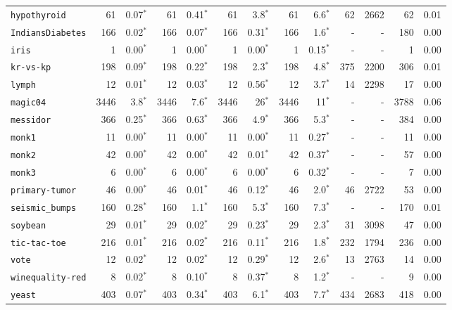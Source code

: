 \begin{tabular}{lrrrrrrrrrrrr}
\texttt{hypothyroid} & 61 & 0.07$^*$ & 61 & 0.41$^*$ & 61 & 3.8$^*$ & 61 & 6.6$^*$ & 62 & 2662 & 62 & 0.01\\
\texttt{IndiansDiabetes} & 166 & 0.02$^*$ & 166 & 0.07$^*$ & 166 & 0.31$^*$ & 166 & 1.6$^*$ & - & - & 180 & 0.00\\
\texttt{iris} & 1 & 0.00$^*$ & 1 & 0.00$^*$ & 1 & 0.00$^*$ & 1 & 0.15$^*$ & - & - & 1 & 0.00\\
\texttt{kr-vs-kp} & 198 & 0.09$^*$ & 198 & 0.22$^*$ & 198 & 2.3$^*$ & 198 & 4.8$^*$ & 375 & 2200 & 306 & 0.01\\
\texttt{lymph} & 12 & 0.01$^*$ & 12 & 0.03$^*$ & 12 & 0.56$^*$ & 12 & 3.7$^*$ & 14 & 2298 & 17 & 0.00\\
\texttt{magic04} & 3446 & 3.8$^*$ & 3446 & 7.6$^*$ & 3446 & 26$^*$ & 3446 & 11$^*$ & - & - & 3788 & 0.06\\
\texttt{messidor} & 366 & 0.25$^*$ & 366 & 0.63$^*$ & 366 & 4.9$^*$ & 366 & 5.3$^*$ & - & - & 384 & 0.00\\
\texttt{monk1} & 11 & 0.00$^*$ & 11 & 0.00$^*$ & 11 & 0.00$^*$ & 11 & 0.27$^*$ & - & - & 11 & 0.00\\
\texttt{monk2} & 42 & 0.00$^*$ & 42 & 0.00$^*$ & 42 & 0.01$^*$ & 42 & 0.37$^*$ & - & - & 57 & 0.00\\
\texttt{monk3} & 6 & 0.00$^*$ & 6 & 0.00$^*$ & 6 & 0.00$^*$ & 6 & 0.32$^*$ & - & - & 7 & 0.00\\
\texttt{primary-tumor} & 46 & 0.00$^*$ & 46 & 0.01$^*$ & 46 & 0.12$^*$ & 46 & 2.0$^*$ & 46 & 2722 & 53 & 0.00\\
\texttt{seismic\_bumps} & 160 & 0.28$^*$ & 160 & 1.1$^*$ & 160 & 5.3$^*$ & 160 & 7.3$^*$ & - & - & 170 & 0.01\\
\texttt{soybean} & 29 & 0.01$^*$ & 29 & 0.02$^*$ & 29 & 0.23$^*$ & 29 & 2.3$^*$ & 31 & 3098 & 47 & 0.00\\
\texttt{tic-tac-toe} & 216 & 0.01$^*$ & 216 & 0.02$^*$ & 216 & 0.11$^*$ & 216 & 1.8$^*$ & 232 & 1794 & 236 & 0.00\\
\texttt{vote} & 12 & 0.02$^*$ & 12 & 0.02$^*$ & 12 & 0.29$^*$ & 12 & 2.6$^*$ & 13 & 2763 & 14 & 0.00\\
\texttt{winequality-red} & 8 & 0.02$^*$ & 8 & 0.10$^*$ & 8 & 0.37$^*$ & 8 & 1.2$^*$ & - & - & 9 & 0.00\\
\texttt{yeast} & 403 & 0.07$^*$ & 403 & 0.34$^*$ & 403 & 6.1$^*$ & 403 & 7.7$^*$ & 434 & 2683 & 418 & 0.00\\
\bottomrule
\end{tabular}
